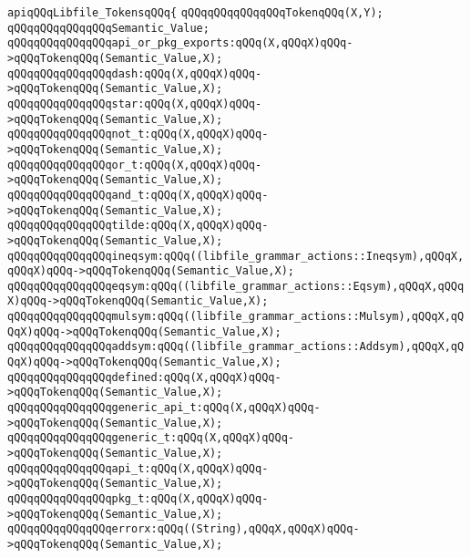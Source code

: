 \label{src/app/makelib/parse/libfile.grammar.api}
\verb|apiqQQqLibfile_TokensqQQq{|\newline
\verb|qQQqqQQqqQQqqQQqTokenqQQq(X,Y);|\newline
\verb|qQQqqQQqqQQqqQQqSemantic_Value;|\newline
\verb|qQQqqQQqqQQqqQQqapi_or_pkg_exports:qQQq(X,qQQqX)qQQq->qQQqTokenqQQq(Semantic_Value,X);|\newline
\verb|qQQqqQQqqQQqqQQqdash:qQQq(X,qQQqX)qQQq->qQQqTokenqQQq(Semantic_Value,X);|\newline
\verb|qQQqqQQqqQQqqQQqstar:qQQq(X,qQQqX)qQQq->qQQqTokenqQQq(Semantic_Value,X);|\newline
\verb|qQQqqQQqqQQqqQQqnot_t:qQQq(X,qQQqX)qQQq->qQQqTokenqQQq(Semantic_Value,X);|\newline
\verb|qQQqqQQqqQQqqQQqor_t:qQQq(X,qQQqX)qQQq->qQQqTokenqQQq(Semantic_Value,X);|\newline
\verb|qQQqqQQqqQQqqQQqand_t:qQQq(X,qQQqX)qQQq->qQQqTokenqQQq(Semantic_Value,X);|\newline
\verb|qQQqqQQqqQQqqQQqtilde:qQQq(X,qQQqX)qQQq->qQQqTokenqQQq(Semantic_Value,X);|\newline
\verb|qQQqqQQqqQQqqQQqineqsym:qQQq((libfile_grammar_actions::Ineqsym),qQQqX,qQQqX)qQQq->qQQqTokenqQQq(Semantic_Value,X);|\newline
\verb|qQQqqQQqqQQqqQQqeqsym:qQQq((libfile_grammar_actions::Eqsym),qQQqX,qQQqX)qQQq->qQQqTokenqQQq(Semantic_Value,X);|\newline
\verb|qQQqqQQqqQQqqQQqmulsym:qQQq((libfile_grammar_actions::Mulsym),qQQqX,qQQqX)qQQq->qQQqTokenqQQq(Semantic_Value,X);|\newline
\verb|qQQqqQQqqQQqqQQqaddsym:qQQq((libfile_grammar_actions::Addsym),qQQqX,qQQqX)qQQq->qQQqTokenqQQq(Semantic_Value,X);|\newline
\verb|qQQqqQQqqQQqqQQqdefined:qQQq(X,qQQqX)qQQq->qQQqTokenqQQq(Semantic_Value,X);|\newline
\verb|qQQqqQQqqQQqqQQqgeneric_api_t:qQQq(X,qQQqX)qQQq->qQQqTokenqQQq(Semantic_Value,X);|\newline
\verb|qQQqqQQqqQQqqQQqgeneric_t:qQQq(X,qQQqX)qQQq->qQQqTokenqQQq(Semantic_Value,X);|\newline
\verb|qQQqqQQqqQQqqQQqapi_t:qQQq(X,qQQqX)qQQq->qQQqTokenqQQq(Semantic_Value,X);|\newline
\verb|qQQqqQQqqQQqqQQqpkg_t:qQQq(X,qQQqX)qQQq->qQQqTokenqQQq(Semantic_Value,X);|\newline
\verb|qQQqqQQqqQQqqQQqerrorx:qQQq((String),qQQqX,qQQqX)qQQq->qQQqTokenqQQq(Semantic_Value,X);|\newline
